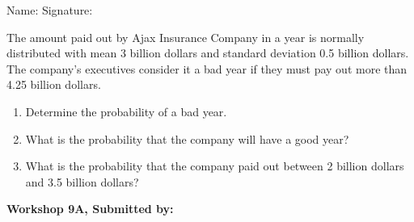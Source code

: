 \documentclass[11pt, chapterprefix=true]{scrbook}\usepackage[]{graphicx}\usepackage[]{color}
\begin{document}
\begin{exercises}
\begin{exercise}
\begin{center}
{{\vspace{4mm}
Name: \underline{\phantom{xxxxxxxxxxxxxxxxxxxxxxxx}} Signature: \underline{\phantom{xxxxxxxxxxxxxxxxxxxxxxxx}}
 }}
\end{center}

The amount paid out by Ajax Insurance Company in a year is normally distributed with mean 3 billion dollars and standard deviation 0.5 billion dollars. The company’s executives consider it a bad year if they must pay out more than 4.25 billion dollars. 

\begin{enumerate}
  \item Determine the probability of a bad year.
  \item What is the probability that the company will have a good year?
  \item What is the probability that the company paid out between 2 billion dollars and 3.5 billion dollars?
\end{enumerate}

\end{exercise} 
\begin{solution}  %

\end{solution}

\clearpage

    \begin{exercise}  %

    \begin{center}
\begin{flushleft}\textbf{\large \hfill Workshop 9A, Submitted by: }\end{flushleft}

\end{center}


\end{exercise}
\end{exercises}
\end{document}
